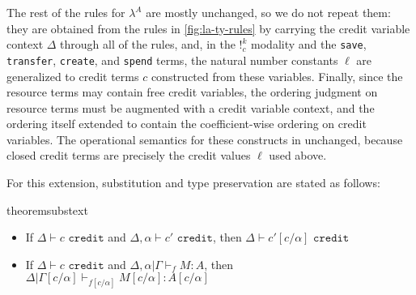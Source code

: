 


The rest of the rules for $\lambda^A$ are mostly unchanged, so we do not repeat them: they are obtained from the rules in \autoref{fig:la-ty-rules} by carrying the credit variable context $\Delta$ through all of the rules, and,
in the $!^k_c$ modality and the \texttt{save}, \texttt{transfer},
\texttt{create}, and \texttt{spend} terms, the natural number constants
$\ell$ are generalized to credit terms $c$ constructed from these variables.
Finally, since the resource terms may contain free credit variables, the ordering judgment on resource terms must be augmented with a credit variable context, and the ordering itself extended to contain the coefficient-wise ordering on credit variables.
The operational semantics for these constructs in unchanged, because closed credit terms are
precisely the credit values $\ell$ used above.

For this extension, substitution and type preservation are stated as follows:

\begin{restatable}[Substitution]{theorem}{substext}\label{thm:subst-ext}
$\;$
\begin{itemize}
  \item If $\Delta \vdash c \texttt{ credit}$ and $\Delta,\alpha \vdash c' \texttt{ credit}$, then $\Delta \vdash c'[c/\alpha] \texttt{ credit}$
  \item If $\Delta \vdash c \texttt{ credit}$ and $\Delta,\alpha|\Gamma\vdash_f M : A$, then $\Delta|\Gamma[c/\alpha] \vdash_{f[c/\alpha]} M[c/\alpha] : A[c/\alpha]$
\end{itemize}
\end{restatable}

